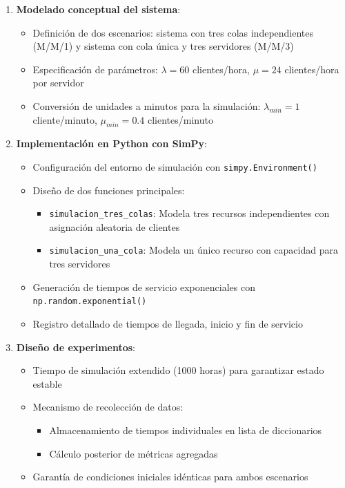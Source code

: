 \documentclass{article}
\begin{document}
\begin{enumerate}
    \item \textbf{Modelado conceptual del sistema}:
        \begin{itemize}
            \item Definición de dos escenarios: sistema con tres colas independientes (M/M/1) y sistema con cola única y tres servidores (M/M/3)
            \item Especificación de parámetros: $\lambda = 60$ clientes/hora, $\mu = 24$ clientes/hora por servidor
            \item Conversión de unidades a minutos para la simulación: $\lambda_{min} = 1$ cliente/minuto, $\mu_{min} = 0.4$ clientes/minuto
        \end{itemize}

    \item \textbf{Implementación en Python con SimPy}:
        \begin{itemize}
            \item Configuración del entorno de simulación con \texttt{simpy.Environment()}
            \item Diseño de dos funciones principales:
                \begin{itemize}
                    \item \texttt{simulacion\_tres\_colas}: Modela tres recursos independientes con asignación aleatoria de clientes
                    \item \texttt{simulacion\_una\_cola}: Modela un único recurso con capacidad para tres servidores
                \end{itemize}
            \item Generación de tiempos de servicio exponenciales con \texttt{np.random.exponential()}
            \item Registro detallado de tiempos de llegada, inicio y fin de servicio
        \end{itemize}

    \item \textbf{Diseño de experimentos}:
        \begin{itemize}
            \item Tiempo de simulación extendido (1000 horas) para garantizar estado estable
            \item Mecanismo de recolección de datos:
                \begin{itemize}
                \item Almacenamiento de tiempos individuales en lista de diccionarios
                \item Cálculo posterior de métricas agregadas
                \end{itemize}
            \item Garantía de condiciones iniciales idénticas para ambos escenarios
        \end{itemize}
\end{enumerate}
\end{document}
